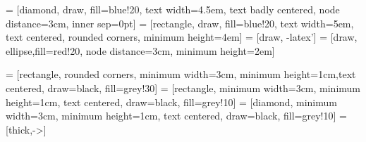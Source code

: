  = [diamond, draw, fill=blue!20, text width=4.5em, text badly centered, node distance=3cm, inner sep=0pt]
 = [rectangle, draw, fill=blue!20, text width=5em, text centered, rounded corners, minimum height=4em]
 = [draw, -latex']
 = [draw, ellipse,fill=red!20, node distance=3cm, minimum height=2em]

 = [rectangle, rounded corners, minimum width=3cm, minimum height=1cm,text centered, draw=black, fill=grey!30]
 = [rectangle, minimum width=3cm, minimum height=1cm, text centered, draw=black, fill=grey!10]
 = [diamond, minimum width=3cm, minimum height=1cm, text centered, draw=black, fill=grey!10]
 = [thick,->]
